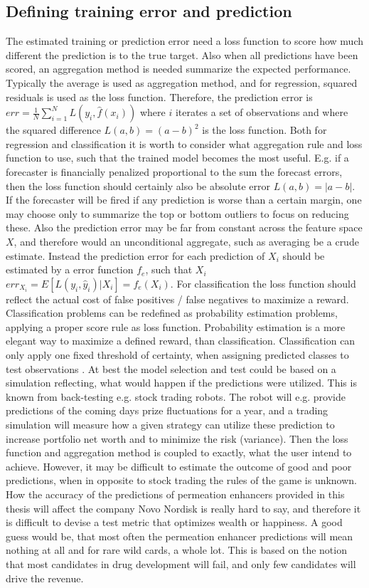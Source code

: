 \subsection{Defining training error and prediction}
The estimated training or prediction error need a loss function to score how much different the prediction is to the true target. Also when all predictions have been scored, an aggregation method is needed summarize the expected performance. Typically the average is used as aggregation method, and for regression, squared residuals is used as the loss function. Therefore, the prediction error is $err = \frac 1 N \sum_{i=1}^N L(y_i,\hat{f}(x_i)) $ where $i$ iterates a set of observations and where the squared difference  $L(a,b) = (a-b)^2$ is the loss function. Both for regression and classification it is worth to consider what aggregation rule and loss function to use, such that the trained model becomes the most useful. E.g. if a forecaster is financially penalized proportional to the sum the forecast errors, then the loss function should certainly also be absolute error $L(a,b) = |a-b|$. If the forecaster will be fired if any prediction is worse than a certain margin, one may choose only to summarize the top or bottom outliers to focus on reducing these. Also the prediction error may be far from constant across the feature space $X$, and therefore would an unconditional aggregate, such as averaging be a crude estimate. Instead the prediction error for each prediction of $X_i$ should be estimated by a error function $f_e$, such that $X_i$ $err_{X_i} = E[L(y_i,\hat{y}_i)|X_i] = f_e(X_i)$. For classification the loss function should reflect the actual cost of false positives / false negatives to maximize a reward. Classification problems can be redefined as probability estimation problems, applying a proper score rule as loss function. Probability estimation is a more elegant way to maximize a defined reward, than classification. Classification can only apply one fixed threshold of certainty, when assigning predicted classes to test observations \cite{harrell1984regression}. At best the model selection and test could be based on a simulation reflecting, what would happen if the predictions were utilized. This is known from back-testing e.g. stock trading robots. The robot will e.g. provide predictions of the coming days prize fluctuations for a year, and a trading simulation will measure how a given strategy can utilize these prediction to increase portfolio net worth and to minimize the risk (variance). Then the loss function and aggregation method is coupled to exactly, what the user intend to achieve. However, it may be difficult to estimate the outcome of good and poor predictions, when in opposite to stock trading the rules of the game is unknown. How the accuracy of the predictions of permeation enhancers provided in this thesis will affect the company Novo Nordisk is really hard to say, and therefore it is difficult to devise a test metric that optimizes wealth or happiness. A good guess would be, that most often the permeation enhancer predictions will mean nothing at all and for rare wild cards, a whole lot. This is based on the notion that most candidates in drug development will fail, and only few candidates will drive the revenue.

